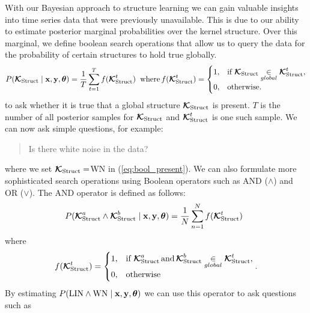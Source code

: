With our Bayesian approach to structure learning we can gain valuable insights
into time series data that were previously unavailable.
This is due to our ability to estimate posterior marginal probabilities over the kernel structure.
Over this marginal, we define boolean search operations that allow us to query the data
for the probability of certain structures to hold true globally.
\begin{equation}
\label{eq:bool_present}
P(\bm{\mathcal{K}}_\text{Struct} \mid \mathbf{x},\mathbf{y},\bm{\theta}) = \frac{1}{T}
\sum\limits_{t=1}^T f(\bm{\mathcal{K}}_\text{Struct}^t)\;\;\text{where}\, f(\bm{\mathcal{K}}_\text{Struct}^t) = \begin{cases}
  1, & \text{if } \bm{\mathcal{K}}_\text{Struct} \underset{global}{\in} \bm{\mathcal{K}}_\text{Struct}^t, \\
  0, & \text{otherwise}.
\end{cases} 
\end{equation}
to ask whether it is true that a global structure $\bm{\mathcal{K}}_\text{Struct}$ is present. $T$
is the number of all posterior samples for $\bm{\mathcal{K}}_\text{Struct}$ and $\bm{\mathcal{K}}_\text{Struct}^t$ is one such
sample. 
We can now ask simple questions, for example:
\begin{quotation}
Is there white noise in the data?
\end{quotation}
where we set $\bm{\mathcal{K}}_\text{Struct} = $WN in (\ref{eq:bool_present}).
We can also formulate more sophisticated search operations using Boolean operators such as AND ($\land$) and OR ($\lor$).
The AND operator is defined as follows:
\[
P(\bm{\mathcal{K}}_\text{Struct}^a \land \bm{\mathcal{K}}_\text{Struct}^b \mid \mathbf{x},\mathbf{y}, \bm{\theta})  = \frac{1}{N}
\sum\limits_{n=1}^N f(\bm{\mathcal{K}}_\text{Struct}^t)\;\;
\]
where
\[
f(\bm{\mathcal{K}}_\text{Struct}^t) = \begin{cases}
  1, & \text{if } \bm{\mathcal{K}}_\text{Struct}^a\, \text{and}\, \bm{\mathcal{K}}_\text{Struct}^b  \underset{global}{\in} \bm{\mathcal{K}}_\text{Struct}^t, \\
  0, & \text{otherwise}\end{cases}.
\]
By estimating $P(\text{LIN} \land \text{WN} \mid \mathbf{x}, \mathbf{y}, \bm{\theta})$ we can use this operator to ask questions such as 
